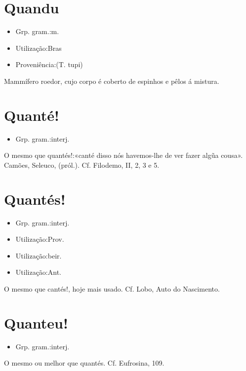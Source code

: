 \section{Quandu}
\begin{itemize}
\item {Grp. gram.:m.}
\end{itemize}
\begin{itemize}
\item {Utilização:Bras}
\end{itemize}
\begin{itemize}
\item {Proveniência:(T. tupi)}
\end{itemize}
Mammífero roedor, cujo corpo é coberto de espinhos e pêlos á mistura.
\section{Quanté!}
\begin{itemize}
\item {Grp. gram.:interj.}
\end{itemize}
O mesmo que \textunderscore quantés!\textunderscore :«\textunderscore canté disso nós havemos-lhe de ver fazer algũa cousa\textunderscore ». Camões, \textunderscore Seleuco\textunderscore , (pról.). Cf. \textunderscore Filodemo\textunderscore , II, 2, 3 e 5.
\section{Quantés!}
\begin{itemize}
\item {Grp. gram.:interj.}
\end{itemize}
\begin{itemize}
\item {Utilização:Prov.}
\end{itemize}
\begin{itemize}
\item {Utilização:beir.}
\end{itemize}
\begin{itemize}
\item {Utilização:Ant.}
\end{itemize}
O mesmo que \textunderscore cantés!\textunderscore , hoje mais usado. Cf. Lobo, \textunderscore Auto do Nascimento\textunderscore .
\section{Quanteu!}
\begin{itemize}
\item {Grp. gram.:interj.}
\end{itemize}
O mesmo ou melhor que \textunderscore quantés\textunderscore . Cf. \textunderscore Eufrosina\textunderscore , 109.
